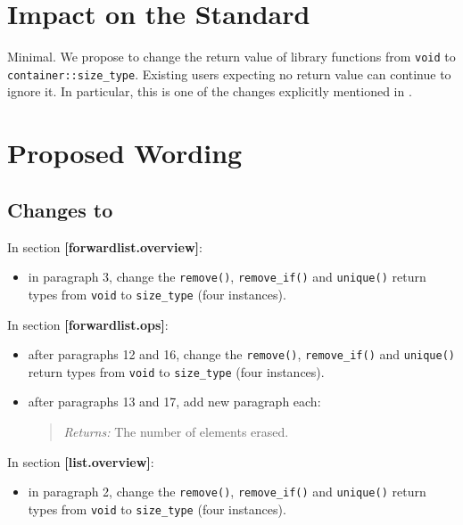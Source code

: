 \documentclass[11pt]{article}
\begin{document}
\section{Impact on the Standard}

Minimal. We propose to change the return value of library functions
from \texttt{void} to \texttt{container::size\_type}. Existing users
expecting no return value can continue to ignore it. In particular,
this is one of the changes explicitly mentioned in \cite{P0921R2}.

\section{Proposed Wording}

\subsection{Changes to \cite{cpp}}

In section \textbf{[forwardlist.overview]}:

\begin{itemize}
\item in paragraph 3, change the \texttt{remove()},
  \texttt{remove\_if()} and \texttt{unique()} return types from
  \texttt{void} to \texttt{size\_type} (four instances).
\end{itemize}

In section \textbf{[forwardlist.ops]}:

\begin{itemize}
\item after paragraphs 12 and 16, change the \texttt{remove()},
  \texttt{remove\_if()} and \texttt{unique()} return types from
  \texttt{void} to \texttt{size\_type} (four instances).
\item after paragraphs 13 and 17, add new paragraph each:
  \begin{quotation}
    \textit{Returns:} The number of elements erased.
  \end{quotation}
\end{itemize}

In section \textbf{[list.overview]}:

\begin{itemize}
\item in paragraph 2, change the \texttt{remove()},
  \texttt{remove\_if()} and \texttt{unique()} return types from
  \texttt{void} to \texttt{size\_type} (four instances).
\end{itemize}
\end{document}
